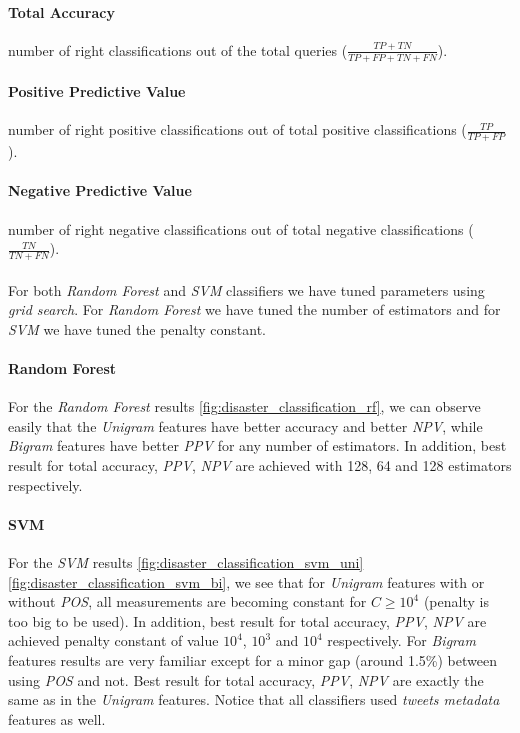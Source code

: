 \documentclass[letterpaper,twocolumn,10pt]{article}
\begin{document}
\paragraph{Total Accuracy} number of right classifications out of the total queries ($ \frac{TP + TN}{TP + FP + TN + FN } $).
\paragraph{Positive Predictive Value} number of right positive classifications out of total positive classifications ($ \frac{TP}{TP + FP} $).
\paragraph{Negative Predictive Value} number of right negative classifications out of total negative classifications ($ \frac{TN}{TN + FN} $).
\\\\
For both \textit{Random Forest} and \textit{SVM} classifiers we have tuned parameters using \textit{grid search}. For \textit{Random Forest} we have tuned the number of estimators and for \textit{SVM} we have tuned the penalty constant. \\
\paragraph{Random Forest} For the \textit{Random Forest} results \ref{fig:disaster_classification_rf}, we can observe easily that the \textit{Unigram} features have better accuracy and better \textit{NPV}, while \textit{Bigram} features have better \textit{PPV} for any number of estimators. In addition, best result for total accuracy, \textit{PPV}, \textit{NPV} are achieved with 128, 64 and 128 estimators respectively.

\paragraph{SVM} For the \textit{SVM} results \ref{fig:disaster_classification_svm_uni} \ref{fig:disaster_classification_svm_bi}, we see that for \textit{Unigram} features with or without \textit{POS}, all measurements are becoming constant for $ C \ge 10^4 $ (penalty is too big to be used). In addition, best result for total accuracy, \textit{PPV}, \textit{NPV} are achieved penalty constant of value $ 10^4 $, $ 10^3 $  and $ 10^4 $ respectively. For \textit{Bigram} features results are very familiar except for a minor gap (around 1.5\%) between using \textit{POS} and not. Best result for total accuracy, \textit{PPV}, \textit{NPV} are exactly the same as in the \textit{Unigram} features. Notice that all classifiers used \textit{tweets metadata} features as well.
\end{document}
